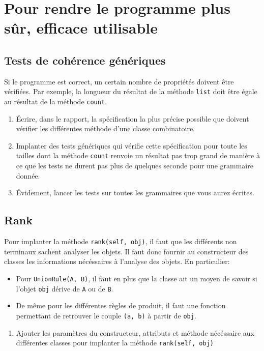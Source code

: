 \documentclass[11pt]{article}
\newcounter{asuivre}
\newenvironment{asks}{\begin{enumerate}\setcounter{enumi}{\theasuivre}}%
                       {\setcounter{asuivre}{\theenumi}\end{enumerate}}
\begin{document}
\section{Pour rendre le programme plus sûr, efficace utilisable}

\subsection{Tests de cohérence génériques}

Si le programme est correct, un certain nombre de propriétés doivent être
vérifiées. Par exemple, la longueur du résultat de la méthode \texttt{list}
doit être égale au résultat de la méthode \texttt{count}.
\begin{asks}
\item Écrire, dans le rapport, la spécification la plus précise possible que
  doivent vérifier les différentes méthode d'une classe combinatoire.
\item Implanter des tests génériques qui vérifie cette spécification pour
  toute les tailles dont la méthode \texttt{count} renvoie un résultat pas
  trop grand de manière à ce que les tests ne durent pas plus de quelques
  seconde pour une grammaire donnée.
\item Évidement, lancer les tests sur toutes les grammaires que vous aurez
  écrites.
\end{asks}

\subsection{Rank}

Pour implanter la méthode \texttt{rank(self, obj)}, il faut que les différents
non terminaux sachent analyser les objets. Il faut donc fournir au constructeur
des classes les informations nécéssaires à l'analyse des objets. En particulier:
\begin{itemize}
\item Pour \texttt{UnionRule(A, B)}, il faut en plus que la classe ait un
  moyen de savoir si l'objet \texttt{obj} dérive de \texttt{A} ou de
  \texttt{B}.
\item De même pour les différentes règles de produit, il faut une fonction
  permettant de retrouver le couple \texttt{(a, b)} à partir de \texttt{obj}.
\end{itemize}
\begin{asks}
\item Ajouter les paramètres du constructeur, attributs et méthode nécéssaire
  aux différentes classes pour implanter la méthode \texttt{rank(self, obj)}
\end{asks}
\end{document}
